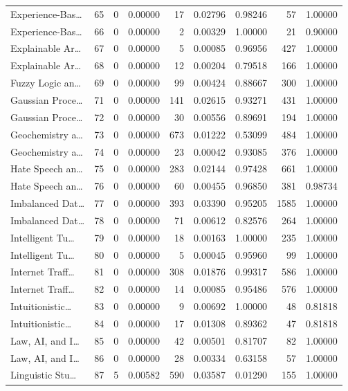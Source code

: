 \begin{table}
\begin{tabular}{lrrrrrrrr}
Experience-Bas… & 65 & 0 & 0.00000 & 17 & 0.02796 & 0.98246 & 57 & 1.00000 \\
Experience-Bas… & 66 & 0 & 0.00000 & 2 & 0.00329 & 1.00000 & 21 & 0.90000 \\
Explainable Ar… & 67 & 0 & 0.00000 & 5 & 0.00085 & 0.96956 & 427 & 1.00000 \\
Explainable Ar… & 68 & 0 & 0.00000 & 12 & 0.00204 & 0.79518 & 166 & 1.00000 \\
Fuzzy Logic an… & 69 & 0 & 0.00000 & 99 & 0.00424 & 0.88667 & 300 & 1.00000 \\
Gaussian Proce… & 71 & 0 & 0.00000 & 141 & 0.02615 & 0.93271 & 431 & 1.00000 \\
Gaussian Proce… & 72 & 0 & 0.00000 & 30 & 0.00556 & 0.89691 & 194 & 1.00000 \\
Geochemistry a… & 73 & 0 & 0.00000 & 673 & 0.01222 & 0.53099 & 484 & 1.00000 \\
Geochemistry a… & 74 & 0 & 0.00000 & 23 & 0.00042 & 0.93085 & 376 & 1.00000 \\
Hate Speech an… & 75 & 0 & 0.00000 & 283 & 0.02144 & 0.97428 & 661 & 1.00000 \\
Hate Speech an… & 76 & 0 & 0.00000 & 60 & 0.00455 & 0.96850 & 381 & 0.98734 \\
Imbalanced Dat… & 77 & 0 & 0.00000 & 393 & 0.03390 & 0.95205 & 1585 & 1.00000 \\
Imbalanced Dat… & 78 & 0 & 0.00000 & 71 & 0.00612 & 0.82576 & 264 & 1.00000 \\
Intelligent Tu… & 79 & 0 & 0.00000 & 18 & 0.00163 & 1.00000 & 235 & 1.00000 \\
Intelligent Tu… & 80 & 0 & 0.00000 & 5 & 0.00045 & 0.95960 & 99 & 1.00000 \\
Internet Traff… & 81 & 0 & 0.00000 & 308 & 0.01876 & 0.99317 & 586 & 1.00000 \\
Internet Traff… & 82 & 0 & 0.00000 & 14 & 0.00085 & 0.95486 & 576 & 1.00000 \\
Intuitionistic… & 83 & 0 & 0.00000 & 9 & 0.00692 & 1.00000 & 48 & 0.81818 \\
Intuitionistic… & 84 & 0 & 0.00000 & 17 & 0.01308 & 0.89362 & 47 & 0.81818 \\
Law, AI, and I… & 85 & 0 & 0.00000 & 42 & 0.00501 & 0.81707 & 82 & 1.00000 \\
Law, AI, and I… & 86 & 0 & 0.00000 & 28 & 0.00334 & 0.63158 & 57 & 1.00000 \\
Linguistic Stu… & 87 & 5 & 0.00582 & 590 & 0.03587 & 0.01290 & 155 & 1.00000 \\

\end{tabular}
\end{table}
